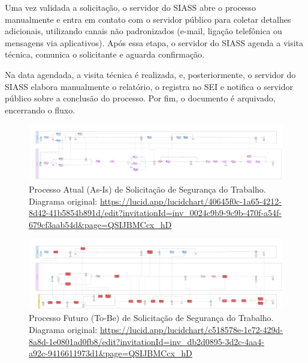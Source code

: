 \documentclass[12pt,a4paper]{article}
\begin{document}
Uma vez validada a solicitação, o servidor do SIASS abre o processo manualmente e entra em contato com o servidor público para coletar detalhes adicionais, utilizando canais não padronizados (e-mail, ligação telefônica ou mensagens via aplicativos). Após essa etapa, o servidor do SIASS agenda a visita técnica, comunica o solicitante e aguarda confirmação.

Na data agendada, a visita técnica é realizada, e, posteriormente, o servidor do SIASS elabora manualmente o relatório, o registra no SEI e notifica o servidor público sobre a conclusão do processo. Por fim, o documento é arquivado, encerrando o fluxo.

\begin{landscape}
\begin{figure}[p]
\centering
\includegraphics[width=0.85\paperwidth, height=0.8\paperheight, keepaspectratio]{images/AS-IS.jpg}
\caption{Processo Atual (As-Is) de Solicitação de Segurança do Trabalho. \\ Diagrama original: \url{https://lucid.app/lucidchart/40645f0c-1a65-4212-8d42-41b5854b891d/edit?invitationId=inv_0024c9b9-9c9b-470f-a54f-679cf3aab54d&page=QSIJBMCcx_hD}}
\end{figure}
\end{landscape}

\begin{landscape}
\begin{figure}[p]
\centering
\includegraphics[width=0.85\paperwidth, height=0.8\paperheight, keepaspectratio]{images/TO-BE.jpg}
\caption{Processo Futuro (To-Be) de Solicitação de Segurança do Trabalho. \\ Diagrama original: \url{https://lucid.app/lucidchart/c518578e-1e72-429d-8a8d-1e0801ad0fb8/edit?invitationId=inv_db2d0895-3d2c-4aa4-a92c-9416611973d1&page=QSIJBMCcx_hD}}
\end{figure}
\end{landscape}
\end{document}
